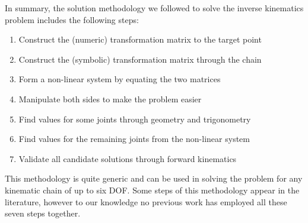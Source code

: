 In summary, the solution methodology we followed to solve the inverse kinematics problem includes the following steps: 
\begin{enumerate}
\item Construct the (numeric) transformation matrix to the target point
\item Construct the (symbolic) transformation matrix through the chain
\item Form a non-linear system by equating the two matrices 
\item Manipulate both sides to make the problem easier
\item Find values for some joints through geometry and trigonometry
\item Find values for the remaining joints from the non-linear system
\item Validate all candidate solutions through forward kinematics
\end{enumerate}
This methodology is quite generic and can be used in solving the problem for any kinematic chain of up to six DOF. Some steps of this methodology appear in the literature, however to our knowledge no previous work has employed all these seven steps together. 



